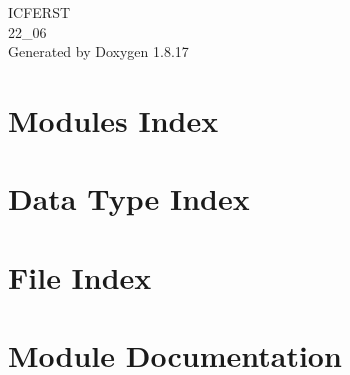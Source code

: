 \let\mypdfximage\pdfximage\def\pdfximage{\immediate\mypdfximage}\documentclass[twoside]{book}
\newcommand{\+}{\discretionary{\mbox{\scriptsize$\hookleftarrow$}}{}{}}
\newcommand{\clearemptydoublepage}{%
  \newpage{\pagestyle{empty}\cleardoublepage}%
}
\begin{document}
\hypersetup{pageanchor=false,
             bookmarksnumbered=true,
             pdfencoding=unicode
            }
\begin{titlepage}
\vspace*{7cm}
\begin{center}%
{\Large I\+C\+F\+E\+R\+ST \\[1ex]\large 22\+\_\+06 }\\
\vspace*{1cm}
{\large Generated by Doxygen 1.8.17}\\
\end{center}
\end{titlepage}
\clearemptydoublepage
{}
\tableofcontents
\clearemptydoublepage
{}
\hypersetup{pageanchor=true}

\chapter{Modules Index}

\chapter{Data Type Index}

\chapter{File Index}

\chapter{Module Documentation}




























\end{document}
